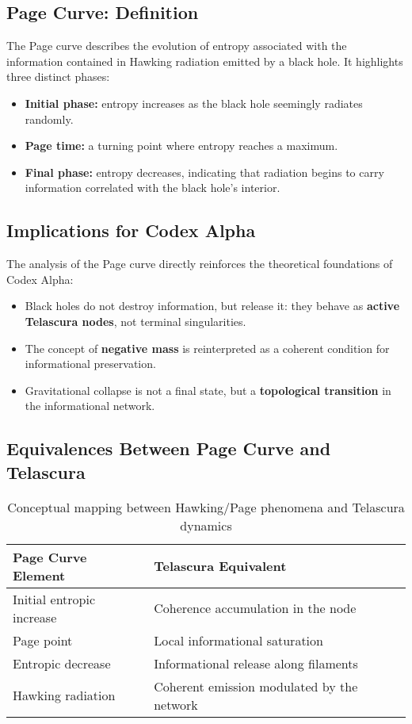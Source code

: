 \documentclass[12pt]{article}
\begin{document}
\subsection*{Page Curve: Definition}
The Page curve describes the evolution of entropy associated with the information contained in Hawking radiation emitted by a black hole. It highlights three distinct phases:
\begin{itemize}
    \item \textbf{Initial phase:} entropy increases as the black hole seemingly radiates randomly.
    \item \textbf{Page time:} a turning point where entropy reaches a maximum.
    \item \textbf{Final phase:} entropy decreases, indicating that radiation begins to carry information correlated with the black hole's interior.
\end{itemize}

\subsection*{Implications for Codex Alpha}
The analysis of the Page curve directly reinforces the theoretical foundations of Codex Alpha:
\begin{itemize}
    \item Black holes do not destroy information, but release it: they behave as \textbf{active Telascura nodes}, not terminal singularities.
    \item The concept of \textbf{negative mass} is reinterpreted as a coherent condition for informational preservation.
    \item Gravitational collapse is not a final state, but a \textbf{topological transition} in the informational network.
\end{itemize}

\subsection*{Equivalences Between Page Curve and Telascura}

\begin{table}[h!]
\centering
\begin{tabular}{|l|l|}
\hline
\textbf{Page Curve Element} & \textbf{Telascura Equivalent} \\
\hline
Initial entropic increase & Coherence accumulation in the node \\
Page point & Local informational saturation \\
Entropic decrease & Informational release along filaments \\
Hawking radiation & Coherent emission modulated by the network \\
\hline
\end{tabular}
\caption{Conceptual mapping between Hawking/Page phenomena and Telascura dynamics}
\end{table}
\end{document}

